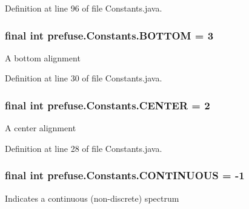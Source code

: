 \-Definition at line 96 of file \-Constants.\-java.

\hypertarget{interfaceprefuse_1_1_constants_ae8f773fc2747294ca6f63cc5605db03b}{
\subsubsection[{\-B\-O\-T\-T\-O\-M}]{\setlength{\rightskip}{0pt plus 5cm}final int {\bf prefuse.\-Constants.\-B\-O\-T\-T\-O\-M} = 3}}\label{interfaceprefuse_1_1_constants_ae8f773fc2747294ca6f63cc5605db03b}
\-A bottom alignment 

\-Definition at line 30 of file \-Constants.\-java.

\hypertarget{interfaceprefuse_1_1_constants_abb460d5070f2ca53d7d7303eab7053d7}{
\subsubsection[{\-C\-E\-N\-T\-E\-R}]{\setlength{\rightskip}{0pt plus 5cm}final int {\bf prefuse.\-Constants.\-C\-E\-N\-T\-E\-R} = 2}}\label{interfaceprefuse_1_1_constants_abb460d5070f2ca53d7d7303eab7053d7}
\-A center alignment 

\-Definition at line 28 of file \-Constants.\-java.

\hypertarget{interfaceprefuse_1_1_constants_af339eb83e76041e60cbed2191a8880af}{
\subsubsection[{\-C\-O\-N\-T\-I\-N\-U\-O\-U\-S}]{\setlength{\rightskip}{0pt plus 5cm}final int {\bf prefuse.\-Constants.\-C\-O\-N\-T\-I\-N\-U\-O\-U\-S} = -\/1}}\label{interfaceprefuse_1_1_constants_af339eb83e76041e60cbed2191a8880af}
\-Indicates a continuous (non-\/discrete) spectrum 

